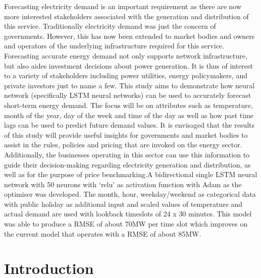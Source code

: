 \documentclass[mstat,12pt]{unswthesis}
\begin{document}
Forecasting electricity demand is an important requirement as there are
now more interested stakeholders associated with the generation and
distribution of this service. Traditionally electricity demand was just
the concern of governments. However, this has now been extended to
market bodies and owners and operators of the underlying infrastructure
required for this service. Forecasting accurate energy demand not only
supports network infrastructure, but also aides investment decisions
about power generation. It is thus of interest to a variety of
stakeholders including power utilities, energy policymakers, and private
investors just to name a few. This study aims to demonstrate how neural
network (specifically LSTM neural networks) can be used to accurately
forecast short-term energy demand. The focus will be on attributes such
as temperature, month of the year, day of the week and time of the day
as well as how past time lags can be used to predict future demand
values. It is envisaged that the results of this study will provide
useful insights for governments and market bodies to assist in the
rules, policies and pricing that are invoked on the energy sector.
Additionally, the businesses operating in this sector can use this
information to guide their decision-making regarding electricity
generation and distribution, as well as for the purpose of price
benchmarking.A bidirectional single LSTM neural network with 50 neurons
with `relu' as activation function with Adam as the optimiser was
developed. The month, hour, weekday/weekend as categorical data with
public holiday as additional input and scaled values of temperature and
actual demand are used with lookback timeslots of 24 x 30 minutes. This
model was able to produce a RMSE of about 70MW per time slot which
improves on the current model that operates with a RMSE of about 85MW.



\afterpreface





%
%






\hypertarget{introduction}{%
\chapter{Introduction}\label{introduction}}
\end{document}
